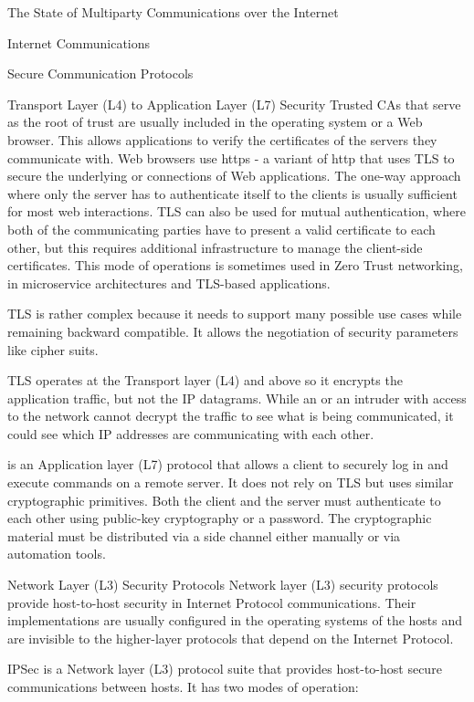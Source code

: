 \begin{frame}[fragile]{The State of Multiparty Communications over the
Internet}
\begin{block}{Internet Communications}
\begin{block}{Secure Communication Protocols}
\begin{block}{Transport Layer (L4) to Application Layer (L7) Security}
Trusted CAs that serve as the root of trust are usually included in the
operating system or a Web browser. This allows applications to verify
the certificates of the servers they communicate with. Web browsers use
\gls{https} \autocite{httpsRFC} - a variant of \gls{http} that uses TLS
to secure the underlying  or  connections of Web
applications. The one-way approach where only the server has to
authenticate itself to the clients is usually sufficient for most web
interactions. TLS can also be used for mutual authentication, where both
of the communicating parties have to present a valid certificate to each
other, but this requires additional infrastructure to manage the
client-side certificates. This mode of operations is sometimes used in
Zero Trust networking, in microservice architectures and TLS-based
 applications.

TLS is rather complex because it needs to support many possible use
cases while remaining backward compatible. It allows the negotiation of
security parameters like cipher suits.

TLS operates at the Transport layer (L4) and above so it encrypts the
application traffic, but not the IP datagrams. While an  or an
intruder with access to the network cannot decrypt the traffic to see
what is being communicated, it could see which IP addresses are
communicating with each other.

 is an Application layer (L7) protocol that allows a client to
securely log in and execute commands on a remote server. It does not
rely on TLS but uses similar cryptographic primitives. Both the client
and the server must authenticate to each other using public-key
cryptography or a password. The cryptographic material must be
distributed via a side channel either manually or via automation tools.
\end{block}

\begin{block}{Network Layer (L3) Security Protocols}
\protect\hypertarget{network-layer-l3-security-protocols}{}
Network layer (L3) security protocols provide host-to-host security in
Internet Protocol communications. Their implementations are usually
configured in the operating systems of the hosts and are invisible to
the higher-layer protocols that depend on the Internet Protocol.

\begin{block}{IPSec}
\protect\hypertarget{ipsec}{}
 is a Network layer (L3) protocol suite that provides
host-to-host secure communications between  hosts. It has two
modes of operation:


\end{block}
\end{block}
\end{block}
\end{block}
\end{frame}
